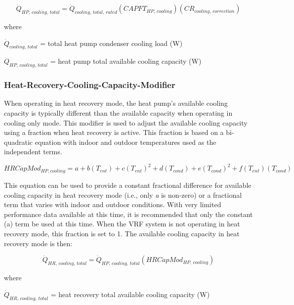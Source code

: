 \begin{equation}
  \dot{Q}_{HP,\,cooling,\,total} = \dot{Q}_{cooling,\,total,\,rated} \left( CAPFT_{HP,\,cooling} \right) \left( CR_{cooling,\,correction} \right)
\end{equation}

where

\(\dot{Q}_{cooling,\,total}\) = total heat pump condenser cooling load (W)

\(\dot{Q}_{HP,\,cooling,\,total}\) = heat pump total available cooling capacity (W)

\subsubsection{Heat-Recovery-Cooling-Capacity-Modifier}\label{heat-recovery-cooling-capacity-modifier}

When operating in heat recovery mode, the heat pump's available cooling capacity is typically different than the available capacity when operating in cooling only mode. This modifier is used to adjust the available cooling capacity using a fraction when heat recovery is active. This fraction is based on a bi-quadratic equation with indoor and outdoor temperatures used as the independent terms.

\begin{equation}
  HRCapMod_{HP,cooling} = a + b \left( T_{ent} \right) + c \left( T_{ent} \right)^2 + d \left( T_{cond} \right) + e \left( T_{cond} \right)^2 + f \left( T_{ent} \right) \left( T_{cond} \right)
\end{equation}

This equation can be used to provide a constant fractional difference for available cooling capacity in heat recovery mode (i.e., only \emph{a} is non-zero) or a fractional term that varies with indoor and outdoor conditions. With very limited performance data available at this time, it is recommended that only the constant (a) term be used at this time. When the VRF system is not operating in heat recovery mode, this fraction is set to 1. The available cooling capacity in heat recovery mode is then:

\begin{equation}
  \dot{Q}_{HR,\,cooling,\,total} = \dot{Q}_{HP,\,cooling,\,total} \left( HRCapMod_{HP,\,cooling} \right)
\end{equation}

where

\(\dot{Q}_{HR,\,cooling,\,total}\) = heat recovery total available cooling capacity (W)

